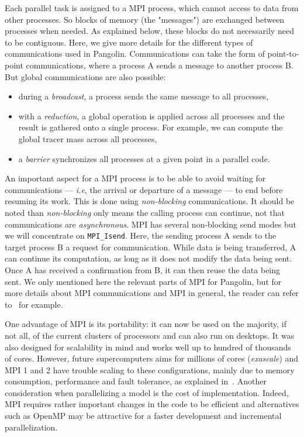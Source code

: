 Each parallel task is assigned to a MPI process, which cannot access to data
from other processes. So blocks of memory (the "messages") are exchanged between
processes when needed. As explained below, these blocks do not necessarily need
to be contiguous. Here, we give more details for the different types of
communications used in Pangolin. Communications can take the form of
point-to-point communications, where a process A sends a message to another
process B. But global communications are also possible:
\begin{itemize}
  \item during a \textit{broadcast}, a process sends the same message to all
    processes,
  \item with a \textit{reduction}, a global operation is applied across all
    processes and the result is gathered onto a single process. For example, we can compute
    the global tracer mass across all processes,
  \item a \textit{barrier} synchronizes all processes at a given point
    in a parallel code.
\end{itemize}

An important aspect for a MPI process is to be able to avoid waiting for
communications --- \textit{i.e}, the arrival or departure of a message --- to end
before resuming its work. This is done using \textit{non-blocking}
communications. It should be noted than \textit{non-blocking} only means the
calling process can continue, not that communications are \textit{asynchronous}.
MPI has several non-blocking send modes but we will concentrate on
\texttt{MPI\_Isend}. Here, the sending process A sends to the target process
B a request for communication. While data is being transferred, A can continue
its computation, as long as it does not modify the data being sent. Once A has
received a confirmation from B, it can then reuse the data being sent. We only
mentioned here the relevant parts of MPI for Pangolin, but for more details
about MPI communications and MPI in general, the reader can refer
to~\cite{Gropp1999} for example.

One advantage of MPI is its portability: it can now be used on the majority, if not
all, of the current clusters of processors and can also run on desktops. It was
also designed for scalability in mind and works well up to hundred of thousands
of cores. However, future supercomputers aims for millions of cores
(\textit{exascale}) and MPI 1 and 2 have trouble scaling to these configurations,
mainly due to memory consumption, performance and fault tolerance, as explained
in~\cite{Thakur2010}. Another consideration when parallelizing a model is the
cost of implementation. Indeed, MPI requires rather important changes in the code
to be efficient and alternatives such as OpenMP may be attractive for a faster
development and incremental parallelization.

